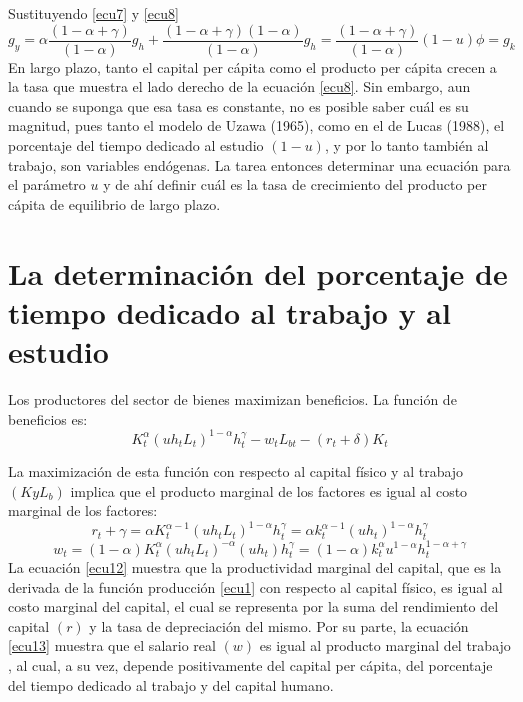 \documentclass[12pt,a4paper]{report}
\begin{document}
	Sustituyendo \ref{ecu7} y \ref{ecu8}
	\begin{equation}\label{ecu10}
		g_y=\alpha\frac{(1-\alpha +\gamma)}{(1-\alpha)}g_h + \frac{(1-\alpha + \gamma)(1-\alpha)}{(1-\alpha)}g_h=\frac{(1-\alpha + \gamma)}{(1-\alpha)}(1-u)\phi=g_k
	\end{equation}
	En largo plazo, tanto el capital per cápita como el producto per cápita crecen a la tasa que muestra el lado derecho de la ecuación \ref{ecu8}. Sin embargo, aun cuando se suponga que esa tasa es constante, no es posible saber cuál es su magnitud, pues tanto el modelo de Uzawa (1965), como en el de Lucas (1988), el porcentaje del tiempo dedicado al estudio $(1-u)$, y por lo tanto también al trabajo, son variables endógenas. La tarea entonces determinar una ecuación para el parámetro $u$ y de ahí definir cuál es la tasa de crecimiento del producto per cápita de equilibrio de largo plazo.
	
	\chapter{La determinación del porcentaje de tiempo dedicado al trabajo y al estudio} 
	Los productores del sector de bienes maximizan beneficios. La función de beneficios es:
	\begin{equation}\label{ecu11}
		K_t^\alpha (uh_tL_t)^{1-\alpha}h_t^\gamma -w_tL_{bt}-(r_t + \delta)K_t
	\end{equation}
	
	La maximización de esta función con respecto al capital físico y al trabajo $(KyL_b)$ implica que el producto marginal de los factores es igual al costo marginal de los factores:
	\begin{equation}\label{ecu12}
		r_t + \gamma=\alpha K_t^{\alpha -1}(uh_tL_t)^{1-\alpha}h_t^\gamma=\alpha k_t^{\alpha -1}(uh_t)^{1-\alpha}h_t^\gamma
	\end{equation}
	\begin{equation}\label{ecu13}
		w_t=(1-\alpha)K_t^\alpha(uh_tL_t)^{-\alpha}(uh_t)h_t^\gamma=(1-\alpha)k_t^\alpha u^{1-\alpha}h_t^{1-\alpha+\gamma}
	\end{equation}
	La ecuación \ref{ecu12} muestra que la productividad marginal del capital, que es la derivada de la función producción \ref{ecu1} con respecto al capital físico, es igual al costo marginal del capital, el cual se representa por la suma del rendimiento del capital $(r)$ y la tasa de depreciación del mismo. Por su parte, la ecuación \ref{ecu13} muestra que el salario real $(w)$ es igual al producto marginal del trabajo , al cual, a su vez, depende positivamente del capital per cápita, del porcentaje del tiempo dedicado al trabajo y del capital humano.
	
\end{document}

